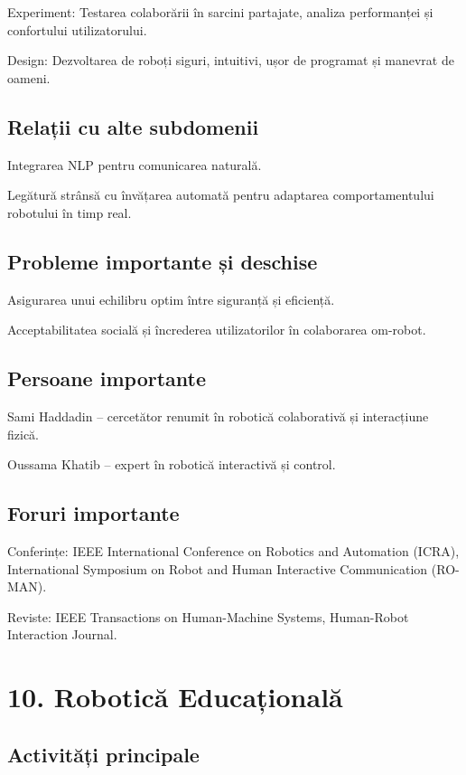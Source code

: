 \documentclass[12pt]{article}
\begin{document}
Experiment:
Testarea colaborării în sarcini partajate, analiza performanței și confortului utilizatorului.

Design:
Dezvoltarea de roboți siguri, intuitivi, ușor de programat și manevrat de oameni.

\subsection*{Relații cu alte subdomenii}

Integrarea NLP pentru comunicarea naturală.

Legătură strânsă cu învățarea automată pentru adaptarea comportamentului robotului în timp real.

\subsection*{Probleme importante și deschise}

Asigurarea unui echilibru optim între siguranță și eficiență.

Acceptabilitatea socială și încrederea utilizatorilor în colaborarea om-robot.

\subsection*{Persoane importante}

Sami Haddadin – cercetător renumit în robotică colaborativă și interacțiune fizică.

Oussama Khatib – expert în robotică interactivă și control.

\subsection*{Foruri importante}

Conferințe: IEEE International Conference on Robotics and Automation (ICRA), International Symposium on Robot and Human Interactive Communication (RO-MAN).

Reviste: IEEE Transactions on Human-Machine Systems, Human-Robot Interaction Journal.

\section{10. Robotică Educațională}

\subsection*{Activități principale}
\end{document}
